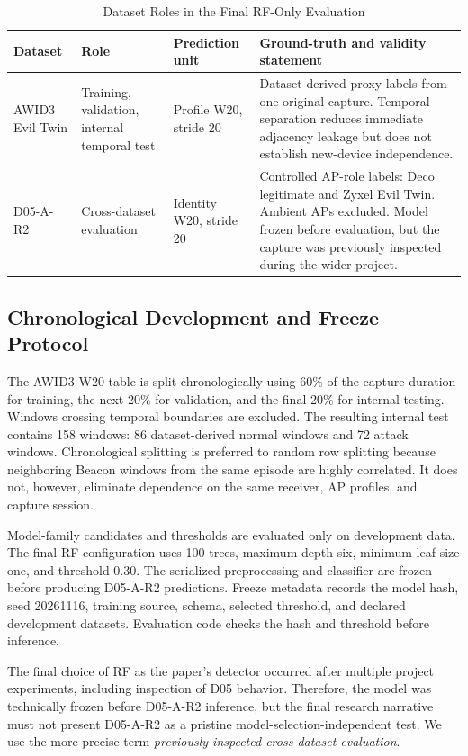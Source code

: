 \documentclass[conference]{IEEEtran}
\begin{document}
\begin{table}[t]
\caption{Dataset Roles in the Final RF-Only Evaluation}
\label{tab:datasets}
\centering
\footnotesize
\begin{tabularx}{\textwidth}{@{}p{23mm}p{26mm}p{32mm}Y@{}}
\toprule
\textbf{Dataset} & \textbf{Role} & \textbf{Prediction unit} & \textbf{Ground-truth and validity statement}\\
\midrule
AWID3 Evil Twin & Training, validation, internal temporal test & Profile W20, stride 20 & Dataset-derived proxy labels from one original capture. Temporal separation reduces immediate adjacency leakage but does not establish new-device independence.\\
D05-A-R2 & Cross-dataset evaluation & Identity W20, stride 20 & Controlled AP-role labels: Deco legitimate and Zyxel Evil Twin. Ambient APs excluded. Model frozen before evaluation, but the capture was previously inspected during the wider project.\\
\bottomrule
\end{tabularx}
\end{table}

\subsection{Chronological Development and Freeze Protocol}

The AWID3 W20 table is split chronologically using 60\% of the capture duration for training, the next 20\% for validation, and the final 20\% for internal testing. Windows crossing temporal boundaries are excluded. The resulting internal test contains 158 windows: 86 dataset-derived normal windows and 72 attack windows. Chronological splitting is preferred to random row splitting because neighboring Beacon windows from the same episode are highly correlated. It does not, however, eliminate dependence on the same receiver, AP profiles, and capture session.

Model-family candidates and thresholds are evaluated only on development data. The final RF configuration uses 100 trees, maximum depth six, minimum leaf size one, and threshold 0.30. The serialized preprocessing and classifier are frozen before producing D05-A-R2 predictions. Freeze metadata records the model hash, seed 20261116, training source, schema, selected threshold, and declared development datasets. Evaluation code checks the hash and threshold before inference.

The final choice of RF as the paper's detector occurred after multiple project experiments, including inspection of D05 behavior. Therefore, the model was technically frozen before D05-A-R2 inference, but the final research narrative must not present D05-A-R2 as a pristine model-selection-independent test. We use the more precise term \emph{previously inspected cross-dataset evaluation}.
\end{document}
